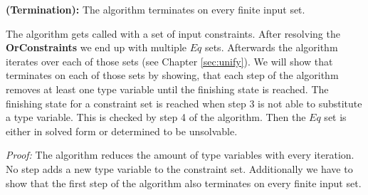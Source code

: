 \begin{theorem}\label{theo:unifyTermination}
  \textbf{(Termination):} The \unify{} algorithm terminates on every finite input set.
\end{theorem}
The \unify{} algorithm gets called with a set of input constraints.
After resolving the \textbf{OrConstraints} we end up with multiple $Eq$ sets.
Afterwards the algorithm iterates over each of those sets (see Chapter \ref{sec:unify}).
We will show that \unify{} terminates on each of those sets by showing,
that each step of the algorithm removes at least one type variable
until the finishing state is reached.
The finishing state for a constraint set is reached when step 3 is not able to substitute a type variable.
This is checked by step 4 of the algorithm.
Then the $Eq$ set is either in solved form or determined to be unsolvable.

\textit{Proof:}
The \unify{} algorithm reduces the amount of type variables with every iteration.
No step adds a new type variable to the constraint set.
Additionally we have to show that the first step of the algorithm also terminates on every finite input set.

